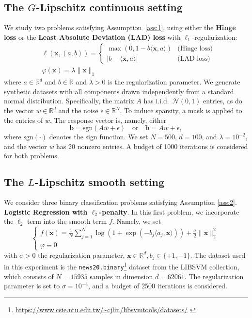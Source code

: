 \documentclass[11pt]{article}
\theoremstyle{plain}
\theoremstyle{definition}
\theoremstyle{remark}
\newcommand{\scalarp}[1]{\langle{#1}\rangle}
\newcommand{\R}{\mathbb{R}}
\newcommand{\m}{d}
\newcommand{\bx}{\bm{x}}
\newcommand{\reg}{\varphi}
\begin{document}
\subsection{The $G$-Lipschitz continuous setting}
We study two problems satisfying Assumption~\ref{ass:1}, using either the \textbf{Hinge loss} or the \textbf{Least Absolute Deviation (LAD) loss} with $\ell_1$-regularization:
\begin{align*}
    & \ell(\bx, (a, b)) = 
    \begin{cases} 
    \max(0, 1 - b \langle \bx, a \rangle) & \text{(Hinge loss)}\\
    |b - \langle \bx, a \rangle| & \text{(LAD loss)}
    \end{cases} \\
    & \reg(\bx) = \lambda \lVert\bx\rVert_1
\end{align*}
where $a \in \R^\m$ and $b \in \R$ and $\lambda > 0$ is the regularization parameter. 
We generate synthetic datasets with all components drawn independently from a standard normal distribution. Specifically, the matrix $A$ has i.i.d.\ $\mathcal{N}(0,1)$ entries, as do the vector $w \in \R^\m$ and the noise $\epsilon\in \R^N$. To induce sparsity, a mask is applied to the entries of $w$. The response vector is, namely, either
\begin{equation*}
    \boldsymbol{b} = \text{sgn}(Aw + \epsilon)\quad \text{or}\quad\boldsymbol{b} = Aw + \epsilon ,
\end{equation*}
where $\text{sgn}(\cdot)$ denotes the sign function. We set $N = 500$, $\m = 100$, and $\lambda = 10^{-2}$, and the vector $w$ has 20 nonzero entries. A budget of 1000 iterations is considered for both problems.
\subsection{The $L$-Lipschitz smooth setting}
We consider three binary classification problems satisfying Assumption \ref{ass:2}. \\

\noindent
\textbf{Logistic Regression with $\ell_2$-penalty}. In this first problem, we incorporate the $\ell_2$ term into the smooth term $f$. Namely, we set 
\begin{equation*}
    \begin{cases}
        f(\bx) = \frac{1}{N}\sum_{j=1}^N\log(1 + \exp(-b_j\scalarp{a_j,\bx})) + \frac{\sigma}{2}\lVert\bx\rVert_2^2 \\
        \reg \equiv 0
    \end{cases}  
\end{equation*}
with $\sigma > 0$ the regularization parameter, $\bx \in \R^\m, b_j \in \{+1, -1\}$. 
The dataset used in this experiment is the \texttt{news20.binary}\footnote{ \url{https://www.csie.ntu.edu.tw/~cjlin/libsvmtools/datasets/} \label{libsvm}} dataset from the LIBSVM collection, which consists of $N = 15935$ samples in dimension $\m = 62061$. The regularization parameter is set to $\sigma = 10^{-4}$, and a budget of 2500 iterations is considered.\\
\end{document}

